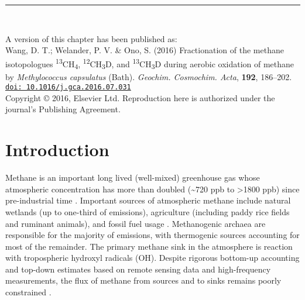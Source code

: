 \vspace*{\fill}

\noindent \rule{\textwidth}{0.4pt}\\

{\small
	
	\noindent A version of this chapter has been published as:\\
	
	\noindent Wang, D. T.; Welander, P. V. \& Ono, S. (2016) Fractionation of the
	methane isotopologues \textsuperscript{13}CH\textsubscript{4},
	\textsuperscript{12}CH\textsubscript{3}D, and
	\textsuperscript{13}CH\textsubscript{3}D during aerobic oxidation of
	methane by \emph{Methylococcus capsulatus} (Bath). \emph{Geochim.
		Cosmochim. Acta}, \textbf{192}, 186--202. 
	\href{http://dx.doi.org/10.1016/j.gca.2016.07.031}{\nolinkurl{doi: 10.1016/j.gca.2016.07.031}}\\
	
	\noindent Copyright © 2016, Elsevier Ltd. Reproduction here is authorized under
	the journal's Publishing Agreement.
	
}

\clearpage

\section{Introduction}\label{sec:4:intro}

Methane is an important long lived (well-mixed) greenhouse gas whose
atmospheric concentration has more than doubled (\textasciitilde{}720
ppb to \textgreater{}1800 ppb) since pre-industrial time \parencite{Wahlen_1993_AREarth,IPCC_AR5_WG1}. Important sources of atmospheric methane include natural
wetlands (up to one-third of emissions), agriculture (including paddy
rice fields and ruminant animals), and fossil fuel usage \parencite{Bousquet++_2006_N,Dlugokencky++_2011_PTRSA}. Methanogenic archaea are
responsible for the majority of emissions, with thermogenic sources
accounting for most of the remainder. The primary methane sink in the
atmosphere is reaction with tropospheric hydroxyl radicals (OH). Despite
rigorous bottom-up accounting and top-down estimates based on remote
sensing data and high-frequency measurements, the flux of methane from
sources and to sinks remains poorly constrained \parencite[e.g.,][]{Kirschke++_2013_NG}.

